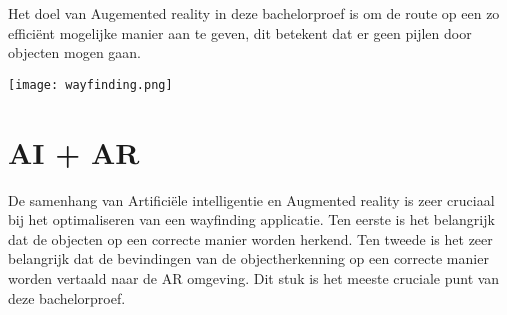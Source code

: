 Het doel van Augemented reality in deze bachelorproef is om de route op een zo efficiënt mogelijke manier aan te geven, dit betekent dat er geen pijlen door objecten mogen gaan.

\texttt{[image: wayfinding.png]}
\section{AI + AR}
De samenhang van Artificiële intelligentie en Augmented reality is zeer cruciaal bij het optimaliseren van een wayfinding applicatie. Ten eerste is het belangrijk dat de objecten op een correcte manier worden herkend. Ten tweede is het zeer belangrijk dat de bevindingen van de objectherkenning op een correcte manier worden vertaald naar de AR omgeving. Dit stuk is het meeste cruciale punt van deze bachelorproef.


